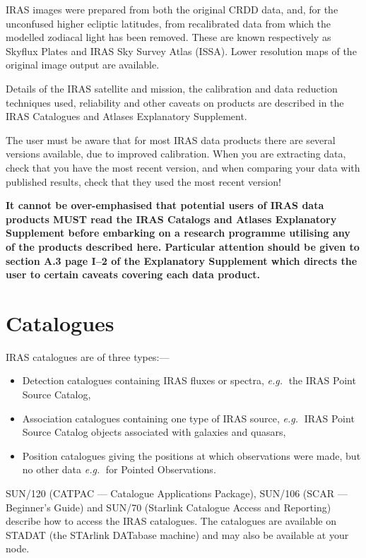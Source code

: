 IRAS images were prepared from both the original CRDD data, and, for the
unconfused higher ecliptic latitudes, from recalibrated data from which the
modelled zodiacal light has been removed. These are known respectively as
Skyflux Plates and IRAS Sky Survey Atlas (ISSA). Lower resolution maps of the
original image output are available. 

Details of the IRAS satellite and mission, the calibration and data
reduction techniques used, reliability and other caveats on products are
described in the IRAS Catalogues and Atlases Explanatory Supplement. 

The user must be aware that for most IRAS data products there are several
versions available, due to improved calibration. When you are extracting data,
check that you have the most recent version, and when comparing your data with
published results, check that they used the most recent version!

{\bf It cannot be over-emphasised that potential users of IRAS data products
MUST read the IRAS Catalogs and Atlases Explanatory Supplement before embarking
on a research programme utilising any of the products described here.
Particular attention should be given to section A.3 page I--2 of the Explanatory
Supplement which directs the user to certain caveats covering each data 
product.}
 
\section {Catalogues}
\label{m:cats}
IRAS catalogues are of three types:---
\begin{itemize}
\item Detection catalogues containing IRAS fluxes or spectra, {\em e.g.}$\;$ the
IRAS Point Source Catalog,
\item Association catalogues containing one type of IRAS source, 
{\em e.g.}$\;$ IRAS Point Source Catalog objects associated with galaxies 
and quasars,
\item Position catalogues giving the positions at which observations were
made, but no other data {\em e.g.}$\;$ for Pointed Observations.
\end{itemize} 
SUN/120 (CATPAC --- Catalogue Applications Package),
SUN/106 (SCAR --- Beginner's Guide) and SUN/70 (Starlink Catalogue Access and 
Reporting) describe how to access the IRAS catalogues. The catalogues are 
available on STADAT (the STArlink DATabase machine) and may also be available 
at your node.

